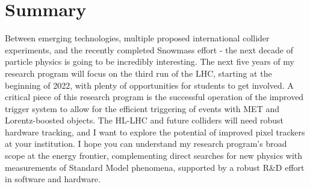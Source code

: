 \documentclass[10pt,a4paper,sans]{moderncv} %
\begin{document}
\section{Summary}
Between emerging technologies, multiple proposed international collider experiments, and the recently completed Snowmass effort - the next decade of particle physics is going to be incredibly interesting. The next five years of my research program will focus on the third run of the LHC, starting at the beginning of 2022, with plenty of opportunities for students to get involved. A critical piece of this research program is the successful operation of the improved trigger system to allow for the efficient triggering of events with MET and Lorentz-boosted objects. The HL-LHC and future colliders will need robust hardware tracking, and I want to explore the potential of improved pixel trackers at your institution.  I hope you can understand my research program's broad scope at the energy frontier, complementing direct searches for new physics with measurements of Standard Model phenomena, supported by a robust R\&D effort in software and hardware.

\printbibliography
\end{document}
